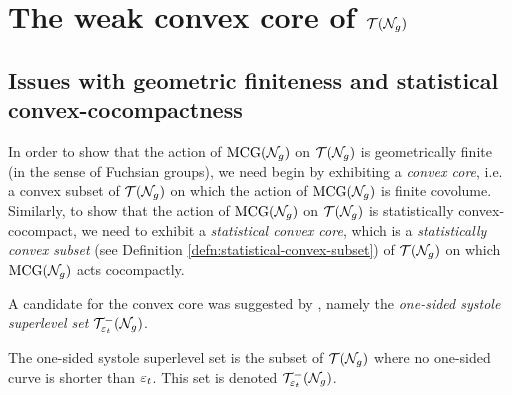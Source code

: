 \documentclass[12pt, reqno]{amsart}
\begin{document}
\section{The weak convex core of $\mathcal{T}(\mathcal{N}_g)$}
\label{sec:weak-convex-core}


\subsection{Issues with geometric finiteness and statistical convex-cocompactness}
\label{sec:issu-with-geom}

In order to show that the action of $\mathrm{MCG}(\mathcal{N}_g)$ on $\mathcal{T}(\mathcal{N}_g)$ is geometrically finite (in the sense of Fuchsian groups), we need begin by exhibiting a \emph{convex core}, i.e. a convex subset of $\mathcal{T}(\mathcal{N}_g)$ on which the action of $\mathrm{MCG}(\mathcal{N}_g)$ is finite covolume.
Similarly, to show that the action of $\mathrm{MCG}(\mathcal{N}_g)$ on $\mathcal{T}(\mathcal{N}_g)$ is statistically convex-cocompact, we need to exhibit a \emph{statistical convex core}, which is a \emph{statistically convex subset} (see Definition \ref{defn:statistical-convex-subset}) of $\mathcal{T}(\mathcal{N}_g)$ on which $\mathrm{MCG}(\mathcal{N}_g)$ acts cocompactly.

A candidate for the convex core was suggested by \textcite{gendulphe2017whats}, namely the \emph{one-sided systole superlevel set} $\mathcal{T}_{\varepsilon_t}^{-}(\mathcal{N}_g)$.

\begin{definition}
  The one-sided systole superlevel set is the subset of $\mathcal{T}(\mathcal{N}_g)$ where no one-sided curve is shorter than $\varepsilon_t$. This set is denoted $\mathcal{T}_{\varepsilon_t}^{-}(\mathcal{N}_g)$.
\end{definition}
\end{document}
